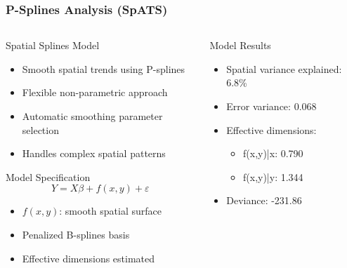\begin{frame}
    \frametitle{P-Splines Analysis (SpATS)}
    
    \begin{columns}[T]
        \begin{column}{0.5\textwidth}
            \begin{block}{Spatial Splines Model}
                \begin{itemize}
                    \item Smooth spatial trends using P-splines
                    \item Flexible non-parametric approach
                    \item Automatic smoothing parameter selection
                    \item Handles complex spatial patterns
                \end{itemize}
            \end{block}
            
            \begin{block}{Model Specification}
                $$Y = X\beta + f(x,y) + \varepsilon$$
                \begin{itemize}
                    \item $f(x,y)$: smooth spatial surface
                    \item Penalized B-splines basis
                    \item Effective dimensions estimated
                \end{itemize}
            \end{block}
        \end{column}
        
        \begin{column}{0.5\textwidth}
            \begin{block}{Model Results}
                \begin{itemize}
                    \item Spatial variance explained: 6.8\%
                    \item Error variance: 0.068
                    \item Effective dimensions:
                    \begin{itemize}
                        \scriptsize
                        \item f(x,y)|x: 0.790
                        \item f(x,y)|y: 1.344
                    \end{itemize}
                    \item Deviance: -231.86
                \end{itemize}
            \end{block}
            

\end{column}
\end{columns}
\end{frame}
